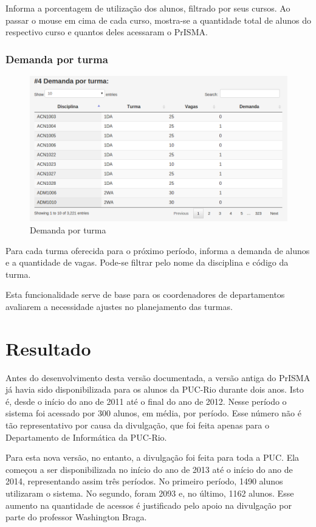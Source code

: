 \documentclass[graduacao,brazil]{ThesisPUC}
\begin{document}
Informa a porcentagem de utilização dos alunos, filtrado por seus cursos. Ao passar o mouse em cima de cada curso, mostra-se a quantidade total de alunos do respectivo curso e quantos deles acessaram o PrISMA.

\subsection{Demanda por turma}

\begin{figure}[H]
    \centering
    \includegraphics[width=0.7\linewidth]{img/v3_estatistica4.png}
    \caption{Demanda por turma}
\end{figure}

Para cada turma oferecida para o próximo período, informa a demanda de alunos e a quantidade de vagas. Pode-se filtrar pelo nome da disciplina e código da turma. 

Esta funcionalidade serve de base para os coordenadores de departamentos avaliarem a necessidade ajustes no planejamento das turmas.


\chapter{Resultado}

Antes do desenvolvimento desta versão documentada, a versão antiga do PrISMA já havia sido disponibilizada para os alunos da PUC-Rio durante dois anos. Isto é, desde o início do ano de 2011 até o final do ano de 2012. Nesse período o sistema foi acessado por 300 alunos, em média, por período. Esse número não é tão representativo por causa da divulgação, que foi feita apenas para o Departamento de Informática da PUC-Rio. 

Para esta nova versão, no entanto, a divulgação foi feita para toda a PUC. Ela começou a ser disponibilizada no início do ano de 2013 até o início do ano de 2014, representando assim três períodos. No primeiro período, 1490 alunos utilizaram o sistema. No segundo, foram 2093 e, no último, 1162 alunos. Esse aumento na quantidade de acessos é justificado pelo apoio na divulgação por parte do professor Washington Braga. 
\end{document}
